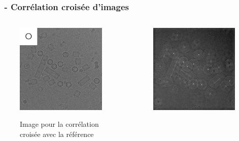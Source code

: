 \documentclass[11pt]{beamer}
\begin{document}
\begin{frame}
\frametitle{\subsecname ~- Corrélation croisée d'images}
	\begin{columns}
		\begin{column}{5cm}
			\begin{figure}
				\includegraphics[scale=0.07]{exempleRond.png}
				
				Image pour la corrélation croisée avec la référence
			\end{figure}
				
		\end{column}
		\begin{column}{5cm}
			\begin{figure}
				\includegraphics[scale=0.07]{Result.png}


\end{figure}
\end{column}
\end{columns}
\end{frame}
\end{document}

